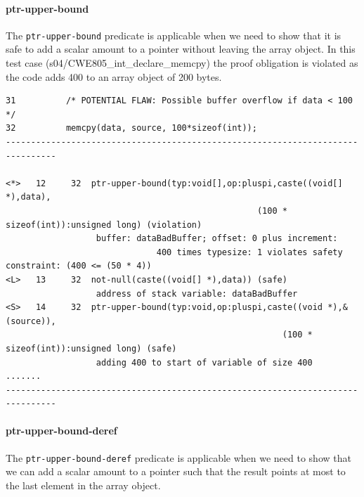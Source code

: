 \documentclass[11pt]{article}
\begin{document}
\paragraph{ptr-upper-bound}
The {\tt  ptr-upper-bound} predicate is applicable when we need to show that
it is safe to add a scalar amount to a pointer without leaving the array object.
In this test case (s04/CWE805\_int\_declare\_memcpy) the proof obligation  is
violated as the code adds 400 to an array object of 200 bytes. 
\begin{tiny}
\begin{verbatim}
31          /* POTENTIAL FLAW: Possible buffer overflow if data < 100 */
32          memcpy(data, source, 100*sizeof(int));
--------------------------------------------------------------------------------
 
<*>   12     32  ptr-upper-bound(typ:void[],op:pluspi,caste((void[] *),data),
                                                  (100 * sizeof(int)):unsigned long) (violation)
                  buffer: dataBadBuffer; offset: 0 plus increment: 
                              400 times typesize: 1 violates safety constraint: (400 <= (50 * 4))
<L>   13     32  not-null(caste((void[] *),data)) (safe)
                  address of stack variable: dataBadBuffer
<S>   14     32  ptr-upper-bound(typ:void,op:pluspi,caste((void *),&(source)),
                                                       (100 * sizeof(int)):unsigned long) (safe)
                  adding 400 to start of variable of size 400
.......
--------------------------------------------------------------------------------
\end{verbatim}
\end{tiny}

\paragraph{ptr-upper-bound-deref}
The {\tt ptr-upper-bound-deref} predicate is applicable when we need to
show that we can add a scalar amount to a pointer such that the result
points at most to the last element in the array object.  
\end{document}
